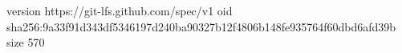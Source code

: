 version https://git-lfs.github.com/spec/v1
oid sha256:9a33f91d343df5346197d240ba90327b12f4806b148fe935764f60dbd6afd39b
size 570
